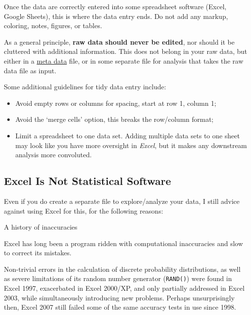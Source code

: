 \documentclass[
]{book}
\providecommand{\tightlist}{%
  \setlength{\itemsep}{0pt}\setlength{\parskip}{0pt}}
\begin{document}
Once the data are correctly entered into some spreadsheet software (Excel, Google Sheets), this is where the data entry ends. Do not add any markup, coloring, notes, figures, or tables.

As a general principle, \textbf{raw data should never be edited}, nor should it be cluttered with additional information. This does not belong in your raw data, but either in a \protect\hyperlink{metadata}{meta data} file, or in some separate file for analysis that takes the raw data file as input.

Some additional guidelines for tidy data entry include:

\begin{itemize}
\tightlist
\item
  Avoid empty rows or columns for spacing, start at row 1, column 1;
\item
  Avoid the `merge cells' option, this breaks the row/column format;
\item
  Limit a spreadsheet to one data set. Adding multiple data sets to one sheet may look like you have more oversight in \emph{Excel}, but it makes any downstream analysis more convoluted.
\end{itemize}

\hypertarget{excel-is-not-statistical-software}{%
\subsection*{Excel Is Not Statistical Software}\label{excel-is-not-statistical-software}}

Even if you do create a separate file to explore/analyze your data, I still advice against using Excel for this, for the following reasons:

A history of inaccuracies

Excel has long been a program ridden with computational inaccuracies and slow to correct its mistakes.

Non-trivial errors in the calculation of discrete probability distributions, as well as severe limitations of its random number generator (\texttt{RAND()}) were found in Excel 1997,\citep{Excel1997a, Excel1997b} exacerbated in Excel 2000/XP,\citep{Excel2000} and only partially addressed in Excel 2003, while simultaneously introducing new problems.\citep{Excel2003a, Excel2003b} Perhaps unsurprisingly then, Excel 2007 still failed some of the same accuracy tests in use since 1998.\citep{Excel2007}
\end{document}
